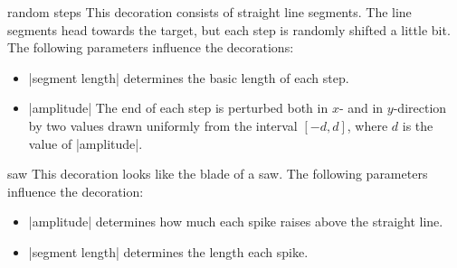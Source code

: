 \begin{decoration}{random steps}
    This decoration consists of straight line segments. The line segments head
    towards the target, but each step is randomly shifted a little bit. The
    following parameters influence the decorations:
    \begin{itemize}
        \item |segment length| determines the basic length of each step.
        \item |amplitude| The end of each step is perturbed both in $x$- and in
            $y$-direction by two values drawn uniformly from the interval
            $[-d,d]$, where $d$ is the value of |amplitude|.
    \end{itemize}
\begin{codeexample}[pre={\pgfmathsetseed{1}},preamble={\usetikzlibrary{decorations.pathmorphing}}]
\end{codeexample}
\end{decoration}

\begin{decoration}{saw}
    This decoration looks like the blade of a saw. The following parameters
    influence the decoration:
    \begin{itemize}
        \item |amplitude| determines how much each spike raises above the
            straight line.
        \item |segment length| determines the length each spike.
    \end{itemize}
\begin{codeexample}[preamble={\usetikzlibrary{decorations.pathmorphing}}]
\end{codeexample}
\end{decoration}

